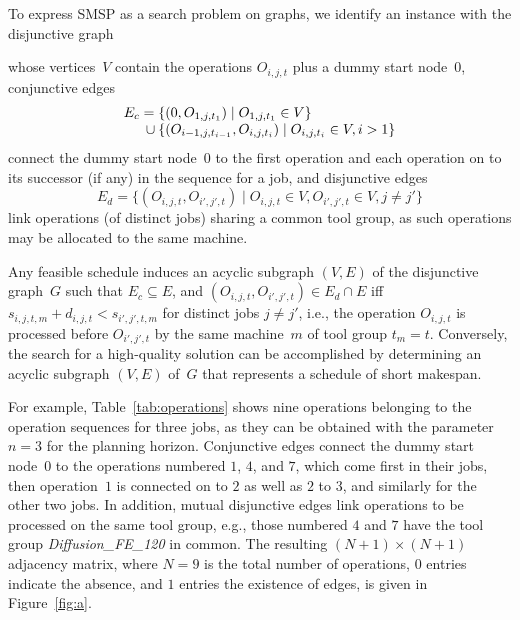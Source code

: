 \documentclass[runningheads]{llncs}
\begin{document}
To express SMSP as a search problem on graphs,
we identify an instance with the disjunctive graph

whose vertices~$V$ contain the operations $O_{i,j,t}$ plus
a dummy start node~$0$,
conjunctive edges\linebreak[1]%
%
\begin{equation}
	\begin{array}{@{}r@{}l@{}}
		E_c = {}
		& \{(0,O_{1,j,t_1}) \mid O_{1,j,t_1}\in V\}
		\\ {} \cup {}
		& \{(O_{i-1,j,t_{i-1}},O_{i,j,t_i}) \mid O_{i,j,t_i}\in V, i > 1\}
	\end{array}
\end{equation}
%
connect the dummy start node~$0$ to the first operation
and each operation on to its successor (if any) in the sequence for a job,
and disjunctive edges\linebreak[1]%
%
\begin{equation}
	E_d = \{(O_{i,j,t},O_{i',j',t}) \mid O_{i,j,t}\in V,O_{i',j',t}\in V, j\neq j'\}
\end{equation}
%
link operations (of distinct jobs) sharing a common tool group,
as such operations may be allocated to the same machine.

Any feasible schedule induces an acyclic subgraph $(V,E)$ of 
the disjunctive graph~$G$
such that $E_c\subseteq E$, and $(O_{i,j,t},O_{i',j',t})\in E_d\cap E$
iff $s_{i,j,t,m}+d_{i,j,t} < s_{i',j',t,m}$ for distinct jobs $j\neq j'$,
i.e., the operation
$O_{i,j,t}$ is processed before $O_{i',j',t}$ by the same machine~$m$
of tool group $t_m=t$.
Conversely,
the search for a high-quality solution can be accomplished by
determining an acyclic subgraph $(V,E)$ of~$G$ that represents a schedule
of short makespan.

For example, Table~\ref{tab:operations} shows nine operations
belonging to the operation sequences for three jobs, as they can
be obtained with the parameter $n=3$ for the planning horizon.
Conjunctive edges connect the dummy start node~$0$ to
the operations numbered $1$, $4$, and $7$, which come first in their jobs,
then operation~$1$ is connected on to $2$ as well as $2$ to $3$,
and similarly for the other two jobs.
In addition, mutual disjunctive edges link operations
to be processed on the same tool group, e.g., those
numbered $4$ and $7$ have the tool group \textit{Diffusion\_FE\_120}
in common.
The resulting $(N+1)\times(N+1)$ adjacency matrix, where $N=9$ is the
total number of operations, $0$ entries indicate the absence, and
$1$ entries the existence of edges, is given in Figure~\ref{fig:a}.
\end{document}
